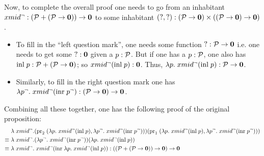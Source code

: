 Now, to complete the overall proof one needs to go from an inhabitant $xmid^{\neg} : (\mathcal{P} + (\mathcal{P} \to \textbf{0})) \to \textbf{0}$ to some inhabitant $(?,?) : (\mathcal{P} \to \textbf{0}) \times ((\mathcal{P} \to \textbf{0}) \to \textbf{0})$.
\begin{itemize}
\item To fill in the ``left question mark'', one needs some function $? : \mathcal{P} \to \textbf{0}$ i.e. one needs to get some $? : \textbf{0}$ given a $p : \mathcal{P}$. But if one has a $p : \mathcal{P}$, one also has $\text{inl}\;p : \mathcal{P} + (\mathcal{P} \to \textbf{0})$; so $xmid^{\neg}(\text{inl}\;p) : \textbf{0}$. Thus, $\lambda p.\;xmid^{\neg}(\text{inl}\;p) : \mathcal{P} \to \textbf{0}$.
\item Similarly, to fill in the right question mark one has $\lambda p^{\neg}.\;xmid^{\neg}(\text{inr}\;p^{\neg}) : (\mathcal{P} \to \textbf{0}) \to \textbf{0}$.
\end{itemize}

Combining all these together, one has the following proof of the original proposition:
\begin{align*}
	&\lambda \;xmid^{\neg}. (\text{pr}_{2}\;(\lambda p.\;xmid^{\neg}(\text{inl}\;p),\lambda p^{\neg}.\;xmid^{\neg}(\text{inr}\;p^{\neg})))(\text{pr}_{1}\;(\lambda p.\;xmid^{\neg}(\text{inl}\;p),\lambda p^{\neg}.\;xmid^{\neg}(\text{inr}\;p^{\neg}))) \\
	\equiv \; &\lambda \;xmid^{\neg}. (\lambda p^{\neg}.\;xmid^{\neg}(\text{inr}\;p^{\neg}))(\lambda p.\;xmid^{\neg}(\text{inl}\;p)) \\
	\equiv \; &\lambda \;xmid^{\neg}. \;xmid^{\neg}(\text{inr}\;\lambda p.\;xmid^{\neg}(\text{inl}\;p)) : ((\mathcal{P} + (\mathcal{P} \to \textbf{0})) \to \textbf{0}) \to \textbf{0}
\end{align*}
